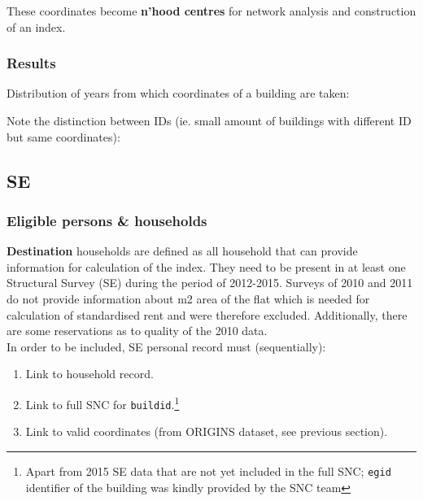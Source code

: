 \documentclass[a4paper, notitlepage, fleqn]{article} %
\begin{document}
These coordinates become \textbf{n'hood centres} for network analysis and construction of an index.  

\subsubsection{Results}

Distribution of years from which coordinates of a building are taken: 
\begin{stlog}\end{stlog}
Note the distinction between IDs (ie. small amount of buildings with different ID but same coordinates):
\begin{stlog}\end{stlog}
\newpage
\subsection{SE}
\subsubsection{Eligible persons \& households}

\textbf{Destination} households are defined as all household that can provide information for calculation of the index. 
They need to be present in at least one Structural Survey (SE) during the period of 2012-2015.
Surveys of 2010 and 2011 do not provide information
about m2 area of the flat which is needed for calculation of standardised rent and were therefore excluded. 
Additionally, there are some reservations as to quality of the 2010 data. \\

In order to be included, SE personal record must (sequentially): 

\begin{enumerate}

	\item Link to household record.
	
	\item Link to full SNC for \texttt{buildid}.\footnote{Apart from 2015 SE data that are not yet included in the full SNC; \texttt{egid} identifier of the building was kindly provided by the SNC team}
	
	\item Link to valid coordinates (from ORIGINS dataset, see previous section).

\end{enumerate}
\end{document}

